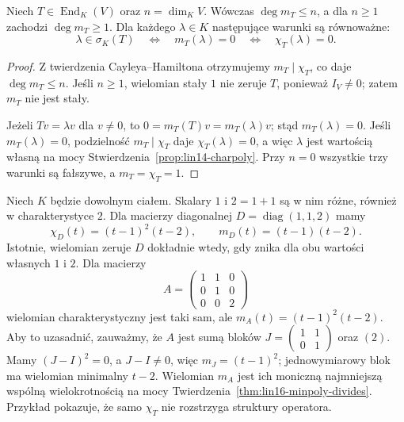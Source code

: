 \begin{wniosek}
\label{cor:lin16-minpoly-spectrum}
Niech \(T\in\operatorname{End}_K(V)\) oraz
\(n=\dim_K V\).
Wówczas \(\deg m_T\le n\), a dla \(n\ge1\)
zachodzi \(\deg m_T\ge1\).
Dla każdego \(\lambda\in K\)
następujące warunki są równoważne:
\[
 \lambda\in\sigma_K(T)
 \quad\Longleftrightarrow\quad
 m_T(\lambda)=0
 \quad\Longleftrightarrow\quad
 \chi_T(\lambda)=0.
\]
\end{wniosek}
\begin{proof}
Z twierdzenia Cayleya--Hamiltona
otrzymujemy \(m_T\mid\chi_T\), co daje
\(\deg m_T\le n\).
Jeśli \(n\ge1\), wielomian stały \(1\)
nie zeruje \(T\), ponieważ \(I_V\ne0\);
zatem \(m_T\) nie jest stały.

Jeżeli \(Tv=\lambda v\) dla \(v\ne0\),
to \(0=m_T(T)v=m_T(\lambda)v\);
stąd \(m_T(\lambda)=0\).
Jeśli \(m_T(\lambda)=0\), podzielność
\(m_T\mid\chi_T\) daje \(\chi_T(\lambda)=0\),
a więc \(\lambda\) jest wartością własną
na mocy
Stwierdzenia~\ref{prop:lin14-charpoly}.
Przy \(n=0\) wszystkie trzy warunki
są fałszywe, a \(m_T=\chi_T=1\).
\end{proof}

\begin{przyklad}
\label{prz:lin16-minpoly-vs-charpoly}
Niech \(K\) będzie dowolnym ciałem.
Skalary \(1\) i \(2=1+1\) są w nim różne,
również w charakterystyce \(2\).
Dla macierzy diagonalnej
\(D=\operatorname{diag}(1,1,2)\)
mamy
\[
 \chi_D(t)=(t-1)^2(t-2),\qquad
 m_D(t)=(t-1)(t-2).
\]
Istotnie, wielomian zeruje \(D\)
dokładnie wtedy, gdy znika dla obu
wartości własnych \(1\) i \(2\).
Dla macierzy
\[
 A=\begin{pmatrix}
 1&1&0\\0&1&0\\0&0&2
 \end{pmatrix}
\]
wielomian charakterystyczny jest taki sam,
ale
\(m_A(t)=(t-1)^2(t-2)\).
Aby to uzasadnić, zauważmy, że
\(A\) jest sumą bloków
\(J=\begin{pmatrix}1&1\\0&1\end{pmatrix}\)
oraz \((2)\).
Mamy \((J-I)^2=0\), a \(J-I\ne0\),
więc \(m_J=(t-1)^2\);
jednowymiarowy blok ma wielomian minimalny
\(t-2\). Wielomian \(m_A\) jest ich
moniczną najmniejszą wspólną wielokrotnością
na mocy
Twierdzenia~\ref{thm:lin16-minpoly-divides}.
Przykład pokazuje, że samo \(\chi_T\)
nie rozstrzyga struktury operatora.
\end{przyklad}

